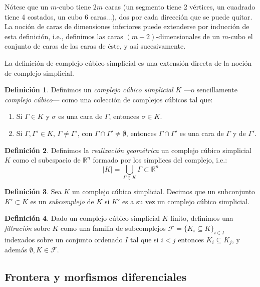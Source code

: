 \documentclass[12pt,a4paper,twoside]{article} %
\theoremstyle{plain}
\theoremstyle{definition}
\newtheorem{definicion}{Definición}[subsection]
\newcommand{\R}{\mathbb{R}}
\begin{document}
Nótese que un $m$-cubo tiene $2m$ caras (un segmento tiene 2 vértices, un cuadrado tiene 4 costados, un cubo 6 caras...), dos por cada dirección que se puede quitar. La noción de caras de dimensiones inferiores puede extenderse por inducción de esta definición, i.e., definimos las caras $(m-2)$-dimensionales de un $m$-cubo el conjunto de caras de las caras de éste, y así sucesivamente.

La definición de complejo cúbico simplicial es una extensión directa de la noción de complejo simplicial.

\begin{definicion}
Definimos un \emph{complejo cúbico simplicial} $K$ ---o sencillamente \emph{complejo cúbico}--- como una colección de complejos cúbicos tal que:
\begin{enumerate}
\item Si $\Gamma \in K$ y $\sigma$ es una cara de $\Gamma$, entonces $\sigma \in K$.
\item Si $\Gamma,\Gamma' \in K$, $\Gamma \neq \Gamma'$, con $\Gamma \cap \Gamma' \neq \emptyset$, entonces $\Gamma \cap \Gamma'$ es una cara de $\Gamma$ y de $\Gamma'$.
\end{enumerate}
\end{definicion}

\begin{definicion}
Definimos la \emph{realización geométrica} un complejo cúbico simplicial $K$ como el subespacio de $\R^n$ formado por los símplices del complejo, i.e.:
$$ \lvert K \rvert = \bigcup_{\Gamma \in K} \Gamma \subset \R^n$$ 
\end{definicion}

\begin{definicion}
Sea $K$ un complejo cúbico simplicial. Decimos que un subconjunto $K' \subset K$ es un \emph{subcomplejo} de $K$ si $K'$ es a su vez un complejo cúbico simplicial.
\end{definicion}

\begin{definicion}
Dado un complejo cúbico simplicial $K$ finito, definimos una \emph{filtración} sobre $K$ como una familia de subcomplejos $\mathcal{F} = \lbrace K_i \subseteq K \rbrace_{i \in I}$ indexados sobre un conjunto ordenado $I$ tal que si $i<j$ entonces $K_i \subseteq K_j$, y además $\emptyset,K \in \mathcal{F}$.
\end{definicion}

\subsection{Frontera y morfismos diferenciales}
\end{document}
